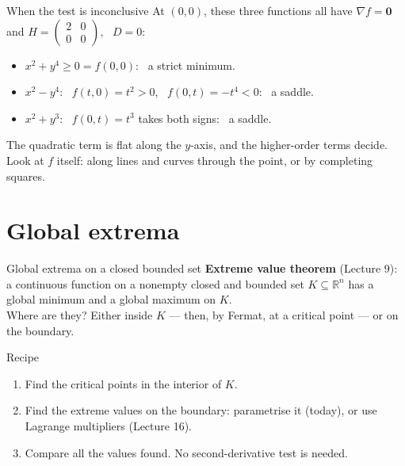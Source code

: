 \documentclass[10pt]{wosm-slides}
\newcommand{\R}{\mathbb{R}}
\begin{document}
\begin{frame}{When the test is inconclusive}
  At $(0, 0)$, these three functions all have $\nabla f = \mathbf 0$ and
  $H = \begin{pmatrix} 2 & 0 \\ 0 & 0 \end{pmatrix}$, \ $D = 0$:
  \begin{itemize}
    \item $x^2 + y^4 \ge 0 = f(0, 0)$: \ a strict minimum.
    \item $x^2 - y^4$: \ $f(t, 0) = t^2 > 0$, \ $f(0, t) = -t^4 < 0$: \ a saddle.
    \item $x^2 + y^3$: \ $f(0, t) = t^3$ takes both signs: \ a saddle.
  \end{itemize}
  \pause
  \begin{warning}[$D = 0$ decides nothing]
    The quadratic term is flat along the $y$-axis, and the higher-order terms decide. Look at
    $f$ itself: along lines and curves through the point, or by completing squares.
  \end{warning}
\end{frame}

\section{Global extrema}

\begin{frame}{Global extrema on a closed bounded set}
  \textbf{Extreme value theorem} (Lecture 9): a continuous function on a nonempty closed and
  bounded set $K \subseteq \R^n$ has a global minimum and a global maximum on $K$.
  \pause\\[0.4em]
  Where are they? Either inside $K$ --- then, by Fermat, at a critical point --- or on the boundary.
  \begin{block}{Recipe}
    \begin{enumerate}
      \item Find the critical points in the interior of $K$.
      \item Find the extreme values on the boundary: parametrise it (today), or use Lagrange
        multipliers (Lecture 16).
      \item Compare all the values found. No second-derivative test is needed.
    \end{enumerate}
  \end{block}
\end{frame}
\end{document}
